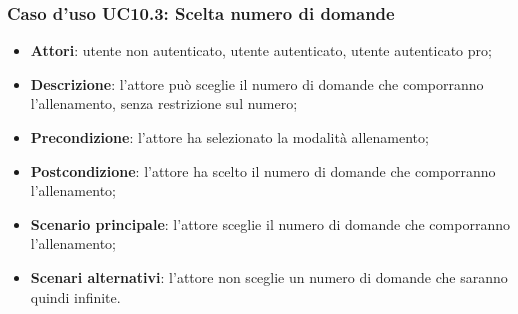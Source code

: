\subsubsection{Caso d'uso UC10.3: Scelta numero di domande}
	\begin{itemize}
		\item \textbf{Attori}: utente non autenticato, utente autenticato, utente autenticato pro;
		\item \textbf{Descrizione}: l'attore può sceglie il numero di domande che comporranno l'allenamento, senza restrizione sul numero;
		\item \textbf{Precondizione}: l'attore ha selezionato la modalità allenamento;
		\item \textbf{Postcondizione}: l'attore ha scelto il numero di domande che comporranno l'allenamento;
		\item \textbf{Scenario principale}: l'attore sceglie il numero di domande che comporranno l'allenamento;
		\item \textbf{Scenari alternativi}: l'attore non sceglie un numero di domande che saranno quindi infinite.
	\end{itemize}
	
